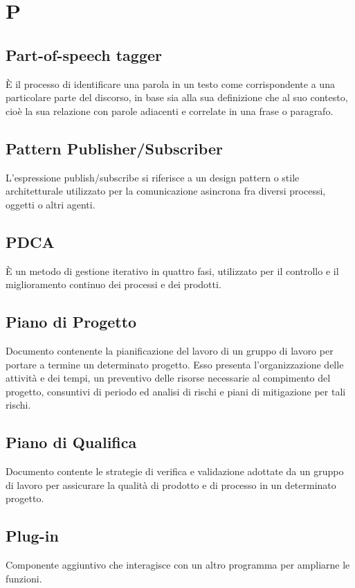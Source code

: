 \section*{P}

\subsection{Part-of-speech tagger}
È il processo di identificare una parola in un testo come corrispondente a una particolare parte del discorso, in base sia alla sua definizione che al suo contesto, cioè la sua relazione con parole adiacenti e correlate in una frase o paragrafo.

\subsection{Pattern Publisher/Subscriber} 
L'espressione publish/subscribe si riferisce a un design pattern o stile architetturale utilizzato per la comunicazione asincrona fra diversi processi, oggetti o altri agenti.

\subsection{PDCA}
È un metodo di gestione iterativo in quattro fasi, utilizzato per il controllo e il miglioramento continuo dei processi e dei prodotti.
 
\subsection{Piano di Progetto}
Documento contenente la pianificazione del lavoro di un gruppo di lavoro per portare a termine un determinato progetto. Esso presenta l'organizzazione delle attività e dei tempi, un preventivo delle risorse necessarie al compimento del progetto, consuntivi di periodo ed analisi di rischi e piani di mitigazione per tali rischi.

\subsection{Piano di Qualifica}
Documento contente le strategie di verifica e validazione adottate da un gruppo di lavoro per assicurare la qualità di prodotto e di processo in un determinato progetto.

\subsection{Plug-in} 
Componente aggiuntivo che interagisce con un altro programma per ampliarne le funzioni.

